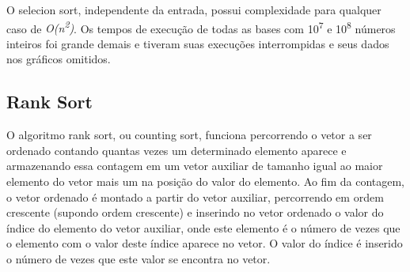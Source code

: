 \documentclass[fleqn,10pt]{SelfArx} %
\begin{document}
{\setlength{\parindent}{-0.5em}
}\newline

{\setlength{\parindent}{-0.5em}
}\newline

{\setlength{\parindent}{-0.5em}
}\newline

O selecion sort, independente da entrada, possui complexidade para qualquer caso de \emph{O(n\textsuperscript{2})}. 
Os tempos de execução de todas as bases com 10\textsuperscript{7} e 10\textsuperscript{8} números inteiros foi grande 
demais e tiveram suas execuções interrompidas e seus dados nos gráficos omitidos.

\subsection{Rank Sort}

O algoritmo rank sort, ou counting sort, funciona percorrendo o vetor a ser ordenado contando quantas vezes um 
determinado elemento aparece e armazenando essa contagem em um vetor auxiliar de tamanho igual ao maior elemento do vetor 
mais um na posição do valor do elemento. Ao fim da contagem, o vetor ordenado é montado a partir do vetor auxiliar, 
percorrendo em ordem crescente (supondo ordem crescente) e inserindo no vetor ordenado o valor do índice do elemento do 
vetor auxiliar, onde este elemento é o número de vezes que o elemento com o valor deste índice aparece no vetor. O valor do 
índice é inserido o número de vezes que este valor se encontra no vetor.
\end{document}
